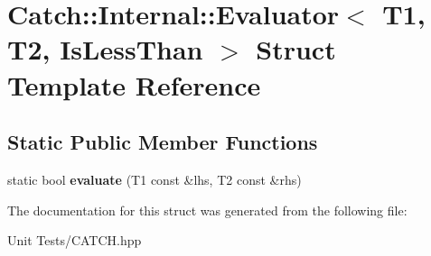 \hypertarget{structCatch_1_1Internal_1_1Evaluator_3_01T1_00_01T2_00_01IsLessThan_01_4}{}\section{Catch\+:\+:Internal\+:\+:Evaluator$<$ T1, T2, Is\+Less\+Than $>$ Struct Template Reference}
\label{structCatch_1_1Internal_1_1Evaluator_3_01T1_00_01T2_00_01IsLessThan_01_4}
\subsection*{Static Public Member Functions}
\begin{DoxyCompactItemize}
\item 
static bool {\bfseries evaluate} (T1 const \&lhs, T2 const \&rhs)\hypertarget{structCatch_1_1Internal_1_1Evaluator_3_01T1_00_01T2_00_01IsLessThan_01_4_a75b2bcf80ce6f90218c145e2c3293d75}{}\label{structCatch_1_1Internal_1_1Evaluator_3_01T1_00_01T2_00_01IsLessThan_01_4_a75b2bcf80ce6f90218c145e2c3293d75}

\end{DoxyCompactItemize}


The documentation for this struct was generated from the following file\+:\begin{DoxyCompactItemize}
\item 
Unit Tests/C\+A\+T\+C\+H.\+hpp\end{DoxyCompactItemize}
